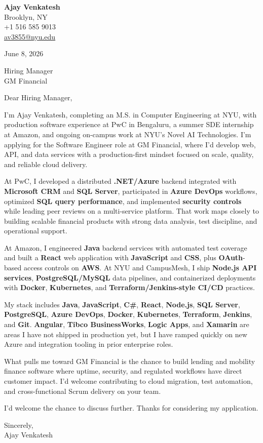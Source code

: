 \documentclass[letterpaper,11pt]{article}
\begin{document}
\begin{flushleft}
\textbf{\large Ajay Venkatesh} \\
Brooklyn, NY \\
+1 516 585 9013 \\
\href{mailto:av3855@nyu.edu}{av3855@nyu.edu}
\end{flushleft}
\vspace{10pt}
June 8, 2026
\vspace{6pt}

Hiring Manager \\
GM Financial

\vspace{10pt}

Dear Hiring Manager,

I'm Ajay Venkatesh, completing an M.S. in Computer Engineering at NYU, with production software experience at PwC in Bengaluru, a summer SDE internship at Amazon, and ongoing on-campus work at NYU's Novel AI Technologies. I'm applying for the Software Engineer role at GM Financial, where I'd develop web, API, and data services with a production-first mindset focused on scale, quality, and reliable cloud delivery.

At PwC, I developed a distributed \textbf{.NET/Azure} backend integrated with \textbf{Microsoft CRM} and \textbf{SQL Server}, participated in \textbf{Azure DevOps} workflows, optimized \textbf{SQL query performance}, and implemented \textbf{security controls} while leading peer reviews on a multi-service platform. That work maps closely to building scalable financial products with strong data analysis, test discipline, and operational support.

At Amazon, I engineered \textbf{Java} backend services with automated test coverage and built a \textbf{React} web application with \textbf{JavaScript} and \textbf{CSS}, plus \textbf{OAuth}-based access controls on \textbf{AWS}. At NYU and CampusMesh, I ship \textbf{Node.js API services}, \textbf{PostgreSQL/MySQL} data pipelines, and containerized deployments with \textbf{Docker}, \textbf{Kubernetes}, and \textbf{Terraform/Jenkins-style CI/CD} practices.

My stack includes \textbf{Java}, \textbf{JavaScript}, \textbf{C\#}, \textbf{React}, \textbf{Node.js}, \textbf{SQL Server}, \textbf{PostgreSQL}, \textbf{Azure DevOps}, \textbf{Docker}, \textbf{Kubernetes}, \textbf{Terraform}, \textbf{Jenkins}, and \textbf{Git}. \textbf{Angular}, \textbf{Tibco BusinessWorks}, \textbf{Logic Apps}, and \textbf{Xamarin} are areas I have not shipped in production yet, but I have ramped quickly on new Azure and integration tooling in prior enterprise roles.

What pulls me toward GM Financial is the chance to build lending and mobility finance software where uptime, security, and regulated workflows have direct customer impact. I'd welcome contributing to cloud migration, test automation, and cross-functional Scrum delivery on your team.

I'd welcome the chance to discuss further. Thanks for considering my application.

\vspace{12pt}
Sincerely, \\
Ajay Venkatesh
\end{document}
